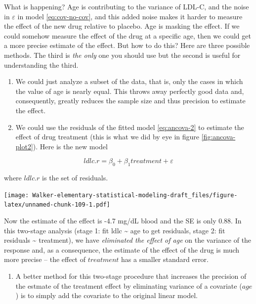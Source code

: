 \documentclass[]{book}
\providecommand{\tightlist}{%
  \setlength{\itemsep}{0pt}\setlength{\parskip}{0pt}}
\begin{document}
What is happening? Age is contributing to the variance of LDL-C, and the noise in \(\varepsilon\) in model \eqref{eq:cov-no-cov}, and this added noise makes it harder to measure the effect of the new drug relative to placebo. Age is masking the effect. If we could somehow measure the effect of the drug at a specific age, then we could get a more precise estimate of the effect. But how to do this? Here are three possible methods. The third is \emph{the only} one you should use but the second is useful for understanding the third.

\begin{enumerate}
\def\labelenumi{\arabic{enumi}.}
\item
  We could just analyze a subset of the data, that is, only the cases in which the value of age is nearly equal. This throws away perfectly good data and, consequently, greatly reduces the sample size and thus precision to estimate the effect.
\item
  We could use the residuals of the fitted model \eqref{eq:ancova-2} to estimate the effect of drug treatment (this is what we did by eye in figure \ref{fig:ancova-plot2}). Here is the new model
\end{enumerate}

\begin{equation}
ldlc.r = \beta_0 + \beta_1 treatment + \varepsilon
\label{eq:ancova-3}
\end{equation}

where \(ldlc.r\) is the set of residuals.

\texttt{[image: Walker-elementary-statistical-modeling-draft\_files/figure-latex/unnamed-chunk-109-1.pdf]}

Now the estimate of the effect is -4.7 mg/dL blood and the SE is only 0.88. In this two-stage analysis (stage 1: fit ldlc \textasciitilde{} age to get residuals, stage 2: fit residuals \textasciitilde{} treatment), we have \emph{eliminated the effect of age} on the variance of the response and, as a consequence, the estimate of the effect of the drug is much more precise -- the effect of \(treatment\) has a smaller standard error.

\begin{enumerate}
\def\labelenumi{\arabic{enumi}.}
\setcounter{enumi}{2}
\tightlist
\item
  A better method for this two-stage procedure that increases the precision of the estmate of the treatment effect by eliminating variance of a covariate (\(age\)) is to simply add the covariate to the original linear model.
\end{enumerate}
\end{document}
